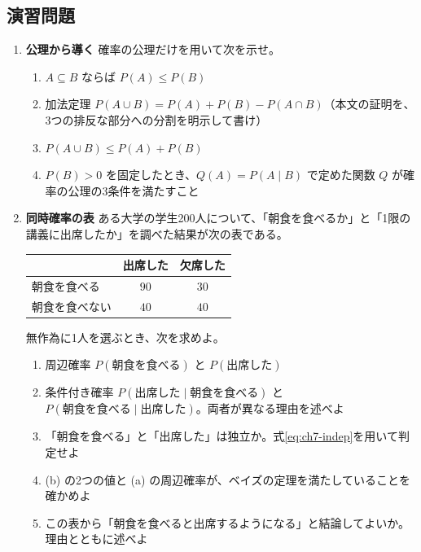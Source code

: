\subsection{演習問題}

\begin{enumerate}

  \item \textbf{公理から導く}\quad
    確率の公理だけを用いて次を示せ。
    \begin{enumerate}
      \item $A \subseteq B$ ならば $P(A) \leq P(B)$
      \item 加法定理 $P(A \cup B) = P(A) + P(B) - P(A \cap B)$（本文の証明を、3つの排反な部分への分割を明示して書け）
      \item $P(A \cup B) \leq P(A) + P(B)$
      \item $P(B) > 0$ を固定したとき、$Q(A) = P(A \mid B)$ で定めた関数 $Q$ が確率の公理の3条件を満たすこと
    \end{enumerate}

  \item \textbf{同時確率の表}\quad
    ある大学の学生200人について、「朝食を食べるか」と「1限の講義に出席したか」を調べた結果が次の表である。
    \begin{center}
      \begin{tabular}{l|cc}
        \hline
         & 出席した & 欠席した \\
        \hline\hline
        朝食を食べる & $90$ & $30$ \\
        朝食を食べない & $40$ & $40$ \\
        \hline
      \end{tabular}
    \end{center}
    無作為に1人を選ぶとき、次を求めよ。
    \begin{enumerate}
      \item 周辺確率 $P(\text{朝食を食べる})$ と $P(\text{出席した})$
      \item 条件付き確率 $P(\text{出席した} \mid \text{朝食を食べる})$ と $P(\text{朝食を食べる} \mid \text{出席した})$。両者が異なる理由を述べよ
      \item 「朝食を食べる」と「出席した」は独立か。式\eqref{eq:ch7-indep}を用いて判定せよ
      \item (b) の2つの値と (a) の周辺確率が、ベイズの定理を満たしていることを確かめよ
      \item この表から「朝食を食べると出席するようになる」と結論してよいか。理由とともに述べよ
    \end{enumerate}


\end{enumerate}
